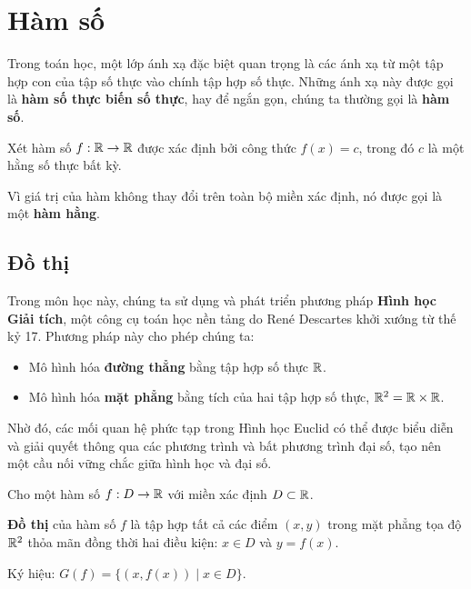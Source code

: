 
\section{Hàm số}
Trong toán học, một lớp ánh xạ đặc biệt quan trọng là các ánh xạ từ một tập hợp con của tập số thực vào chính tập hợp số thực. Những ánh xạ này được gọi là \textbf{hàm số thực biến số thực}, hay để ngắn gọn, chúng ta thường gọi là \textbf{hàm số}.

\begin{example}
    Xét hàm số $f: \mathbb{R} \to \mathbb{R}$ được xác định bởi công thức $f(x) = c$, trong đó $c$ là một hằng số thực bất kỳ.
    
    Vì giá trị của hàm không thay đổi trên toàn bộ miền xác định, nó được gọi là một \textbf{hàm hằng}.
\end{example}

\subsection{Đồ thị}
Trong môn học này, chúng ta sử dụng và phát triển phương pháp \textbf{Hình học Giải tích}, một công cụ toán học nền tảng do René Descartes khởi xướng từ thế kỷ 17. Phương pháp này cho phép chúng ta:
\begin{itemize}
    \item Mô hình hóa \textbf{đường thẳng} bằng tập hợp số thực $\mathbb{R}$.
    \item Mô hình hóa \textbf{mặt phẳng} bằng tích của hai tập hợp số thực, $\mathbb{R}^2 = \mathbb{R} \times \mathbb{R}$.
\end{itemize}

Nhờ đó, các mối quan hệ phức tạp trong Hình học Euclid có thể được biểu diễn và giải quyết thông qua các phương trình và bất phương trình đại số, tạo nên một cầu nối vững chắc giữa hình học và đại số.

\begin{definition}
    Cho một hàm số $f: D \to \mathbb{R}$ với miền xác định $D \subset \mathbb{R}$.
    
    \textbf{Đồ thị} của hàm số $f$ là tập hợp tất cả các điểm $(x, y)$ trong mặt phẳng tọa độ $\mathbb{R}^2$ thỏa mãn đồng thời hai điều kiện: $x \in D$ và $y = f(x)$.
    
    Ký hiệu: $G(f) = \{ (x, f(x)) \mid x \in D \}$.
\end{definition}

